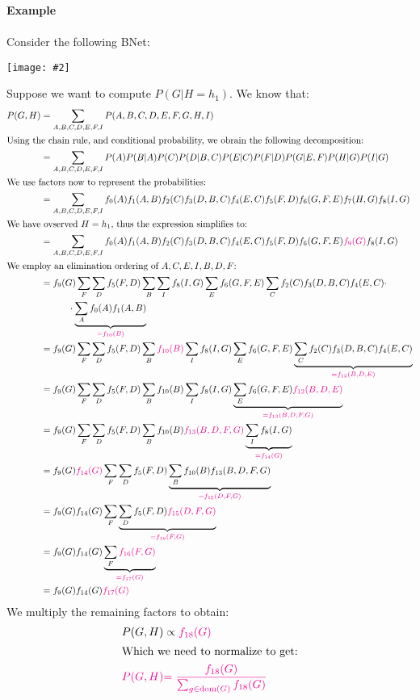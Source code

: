 \documentclass{article}
\newcommand{\centerfig}[2]{\begin{center}\texttt{[image: \#2]}\end{center}}
\begin{document}
\begin{siderules}
	\textbf{Example}\\
	\\
	Consider the following BNet:
	\centerfig{0.15}{BNet-6}
	Suppose we want to compute $ P(G | H = h_1) $. We know that:
	\begin{align*}
	P(G, H) &= \sum_{A, B,C,D,E,F,I} P(A,B,C,D,E,F,G,H,I) \\
	\intertext{Using the chain rule, and conditional probability, we obrain the following decomposition:}
	 &= \sum_{A, B,C,D,E,F,I} P(A)P(B|A)P(C)P(D|B,C)P(E | C)P(F | D) P(G|E, F) P(H|G) P(I|G) \\
	 \intertext{We use factors now to represent the probabilities:}	 \
	 &=  \sum_{A, B,C,D,E,F,I}f_0(A)f_1(A,B)f_2(C)f_3(D, B, C)f_4(E,C) f_5(F,D) f_6(G,F,E) f_7(H,G)f_8(I,G) \\
	 \intertext{We have ovserved $ H = h_1 $, thus the expression simplifies to:}
	 &=  \sum_{A, B,C,D,E,F,I}f_0(A)f_1(A,B)f_2(C)f_3(D, B, C)f_4(E,C) f_5(F,D) f_6(G,F,E) {\color{Magenta}f_9(G)}f_8(I,G) \\
	 \intertext{We employ an elimination ordering of $ A, C, E, I, B, D, F  $:}
	 &=f_9(G)\sum_F \sum_D f_5(F,D) \sum_B  \sum_I f_8(I,G) \sum_E f_6(G,F,E) \sum_C f_2(C) f_3(D, B, C)f_4(E,C)  \cdot  \\ & \quad \quad \quad \cdot \underbrace{\sum_A f_0(A)f_1(A,B)}_{{\color{Magenta}=f_{10}(B)}}\\
	 &= f_9(G)\sum_F \sum_D f_5(F,D) \sum_B  {\color{Magenta}f_{10}(B)} \sum_I f_8(I,G) \sum_E f_6(G,F,E) \underbrace{\sum_C f_2(C) f_3(D, B, C)f_4(E,C)}_{{\color{Magenta}=f_{12}(B,D,E)}} \\
	 &= f_9(G)\sum_F \sum_D f_5(F,D) \sum_B  f_{10}(B) \sum_I f_8(I,G) \underbrace{\sum_E f_6(G,F,E) {\color{Magenta}f_{12}(B,D,E)}}_{\color{Magenta}= f_{13}(B,D,F,G)}\\
	 &=f_9(G)\sum_F \sum_D f_5(F,D) \sum_B  f_{10}(B) {\color{Magenta}f_{13}(B,D,F,G)} \underbrace{\sum_I f_8(I,G)}_{\color{Magenta}=f_{14}(G)} \\
	 &=f_9(G){\color{Magenta}f_{14}(G)}\sum_F \sum_D f_5(F,D) \underbrace{\sum_B  f_{10}(B) f_{13}(B,D,F,G)}_{\color{Magenta}=f_{15}(D,F,G)}\\
	 &= f_9(G)f_{14}(G)\sum_F\underbrace{ \sum_D f_5(F,D) {\color{Magenta}f_{15}(D,F,G)}}_{\color{Magenta}=f_{16}(F,G)} \\
	 &=f_9(G)f_{14}(G)\underbrace{\sum_F{\color{Magenta}f_{16}(F,G)}}_{\color{Magenta}=f_{17}(G)}\\
	 &= f_9(G)f_{14}(G){\color{Magenta}f_{17}(G)}
	 \end{align*}
We multiply the remaining factors to obtain:
\begin{align*}
	 P(G, H)&\propto {\color{Magenta}f_{18}(G)} \\
	 \intertext{Which we need to normalize to get:}
	 {\color{Magenta}P(G, H)} &{\color{Magenta} =\frac{f_{18}(G)}{\sum_{g \in \text{dom}(G)}f_{18}(G)}}
\end{align*}
	\end{siderules}
\end{document}
